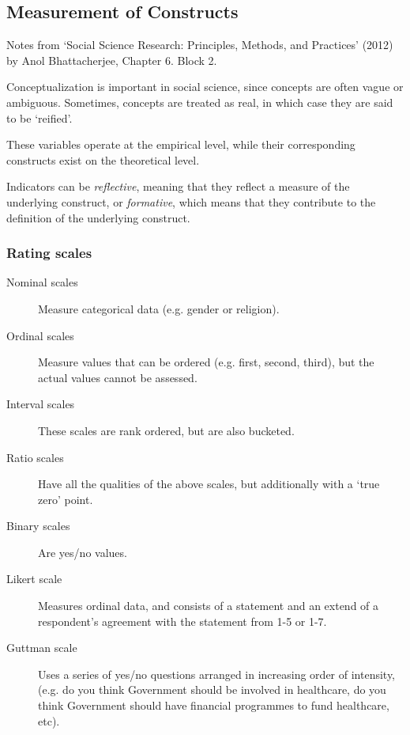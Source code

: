 \subsection{Measurement of Constructs}
\begin{flushright}
  \scriptsize Notes from `Social Science Research: Principles, Methods, and
  Practices' (2012) by Anol Bhattacherjee, Chapter 6. Block 2.
\end{flushright}


Conceptualization is important in social science, since concepts are
often vague or ambiguous. Sometimes, concepts are treated as real, in
which case they are said to be `reified'.

 These variables operate at the empirical level, while
their corresponding constructs exist on the theoretical level.

Indicators can be \textit{reflective}, meaning that they reflect a
measure of the underlying construct, or \textit{formative}, which
means that they contribute to the definition of the underlying
construct.

\subsubsection{Rating scales}


\begin{description}
  \item[Nominal scales] Measure categorical data (e.g. gender or
    religion).
  \item[Ordinal scales] Measure values that can be ordered
    (e.g. first, second, third), but the actual values cannot be
    assessed.
  \item[Interval scales] These scales are rank ordered, but are also
    bucketed.
  \item[Ratio scales] Have all the qualities of the above scales, but
    additionally with a `true zero' point.
  \item[Binary scales] Are yes/no values.
  \item[Likert scale] Measures ordinal data, and consists of a
    statement and an extend of a respondent's agreement with the
    statement from 1-5 or 1-7.
  \item[Guttman scale] Uses a series of yes/no questions arranged in
    increasing order of intensity, (e.g. do you think Government
    should be involved in healthcare, do you think Government should
    have financial programmes to fund healthcare, etc).
\end{description}

